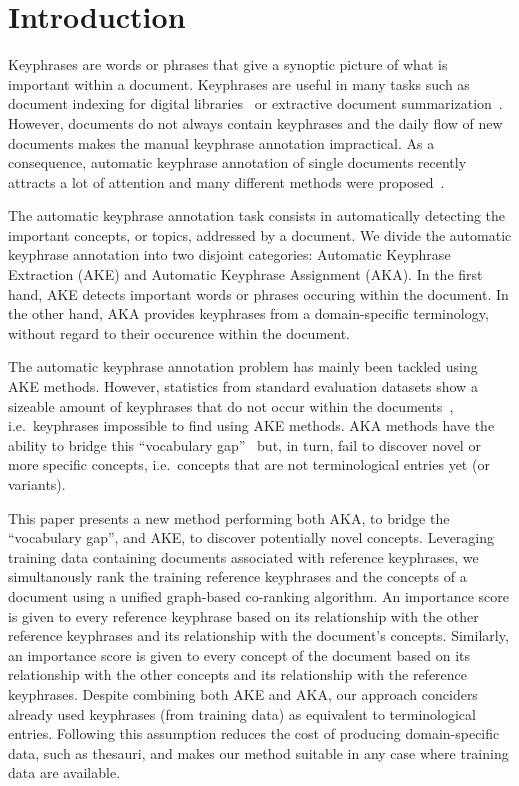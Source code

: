 \section{Introduction}
\label{sec: introduction}
  Keyphrases are words or phrases that give a synoptic picture of what is
  important within a document. Keyphrases are useful in many tasks such as
  document indexing for digital
  libraries~\cite{gutwin1999keyphrasesfordigitallibraries} or extractive
  document summarization~\cite{litvak2008graphbased}. However, documents do not
  always contain keyphrases and the daily flow of new documents makes the manual
  keyphrase annotation impractical. As a consequence, automatic keyphrase
  annotation of single documents recently attracts a lot of attention and many
  different methods were proposed~\cite{hasan2014state_of_the_art}.

  The automatic keyphrase annotation task consists in automatically detecting
  the important concepts, or topics, addressed by a document. We divide the
  automatic keyphrase annotation into two disjoint categories: Automatic
  Keyphrase Extraction (AKE) and Automatic Keyphrase Assignment (AKA). In the
  first hand, AKE detects important words or phrases occuring within the
  document. In the other hand, AKA provides keyphrases from a domain-specific
  terminology, without regard to their occurence within the document.

  The automatic keyphrase annotation problem has mainly been tackled using AKE
  methods. However, statistics from standard evaluation datasets show a sizeable
  amount of keyphrases that do not occur within the
  documents~\cite{bougouin2013topicrank}, i.e.~keyphrases impossible to find
  using AKE methods. AKA methods have the ability to bridge this ``vocabulary
  gap''~\cite{liu2011vocabularygap} but, in turn, fail to discover novel or more
  specific concepts, i.e.~concepts that are not terminological entries yet (or
  variants).

  This paper presents a new method performing both AKA, to bridge the
  ``vocabulary gap'', and AKE, to discover potentially novel concepts.
  Leveraging training data containing documents associated with reference
  keyphrases, we simultanously rank the training reference keyphrases and the
  concepts of a document using a unified graph-based co-ranking algorithm. An
  importance score is given to every reference keyphrase based on its
  relationship with the other reference keyphrases and its relationship with the
  document's concepts. Similarly, an importance score is given to every concept
  of the document based on its relationship with the other concepts and its
  relationship with the reference keyphrases. Despite combining both AKE and
  AKA, our approach conciders already used keyphrases (from training data) as
  equivalent to terminological entries. Following this assumption reduces the
  cost of producing domain-specific data, such as thesauri, and makes our method
  suitable in any case where training data are available.

